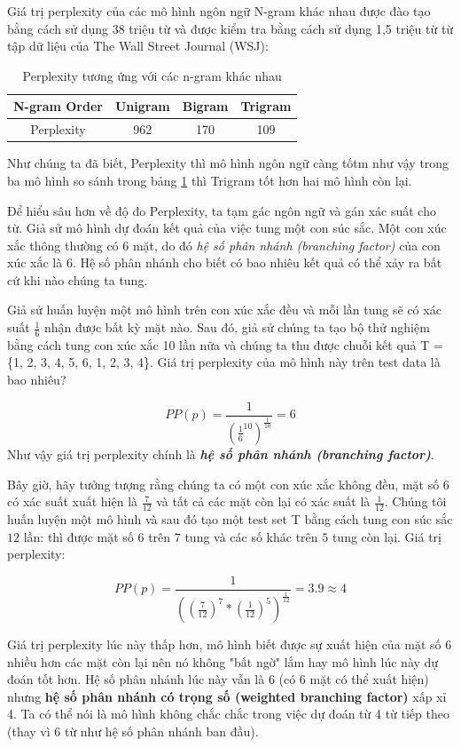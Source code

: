 Giá trị perplexity của các mô hình ngôn ngữ N-gram khác nhau được đào tạo bằng cách sử dụng 38 triệu từ và được kiểm tra bằng cách sử dụng 1,5 triệu từ từ tập dữ liệu của The Wall Street Journal (WSJ):
\begin{table}[H]
\centering
\begin{tabular}{ |c|c|c|c| }
 \hline
 N-gram Order & Unigram & Bigram & Trigram \\
  \hline
 Perplexity & 962 & 170 & 109 \\
 \hline
\end{tabular}
\caption{Perplexity tương ứng với các n-gram khác nhau}
\label{Perplexity}
\end{table}
 Như chúng ta đã biết, Perplexity thì mô hình ngôn ngữ càng tốtm như vậy trong ba mô hình so sánh trong bảng \ref{Perplexity} thì Trigram tốt hơn hai mô hình còn lại.

 Để hiểu sâu hơn về độ đo Perplexity, ta tạm gác ngôn ngữ và gán xác suất cho từ. Giả sử mô hình dự đoán kết quả của việc tung một con súc sắc. Một con xúc xắc thông thường có 6 mặt, do đó \textit{hệ số phân nhánh (branching factor)} của con xúc xắc là 6. Hệ số phân nhánh cho biết có bao nhiêu kết quả có thể xảy ra bất cứ khi nào chúng ta tung.

 Giả sử huấn luyện một mô hình trên con xúc xắc đều và mỗi lần tung sẽ có xác suất $\frac{1}{6}$ nhận được bất kỳ mặt nào. Sau đó, giả sử chúng ta tạo bộ thử nghiệm bằng cách tung con xúc xắc 10 lần nữa và chúng ta thu được chuỗi kết quả  T = \{1, 2, 3, 4, 5, 6, 1, 2, 3, 4\}. Giá trị perplexity của mô hình này trên test data là bao nhiêu?

 $$PP(p)=\frac{1}{(\frac{1}{6}^{10})^{\frac{1}{10}}}=6$$
 Như vậy giá trị perplexity chính là \textbf{\textit{hệ số phân nhánh (branching factor)}}.

 Bây giờ, hãy tưởng tượng rằng chúng ta có một con xúc xắc không đều, mặt số 6 có xác suất xuất hiện là $\frac{7}{12}$ và tất cả các mặt còn lại có xác suất là $\frac{1}{12}$. Chúng tôi huấn luyện một mô hình và sau đó tạo một test set T bằng cách tung con súc sắc $12$ lần: thì được mặt số $6$ trên $7$ tung và các số khác trên $5$ tung còn lại. Giá trị perplexity:

  $$PP(p)=\frac{1}{((\frac{7}{12})^{7}*(\frac{1}{12})^{5})^{\frac{1}{12}}}=3.9\approx 4$$

  Giá trị perplexity lúc này thấp hơn, mô hình biết được sự xuất hiện của mặt số 6 nhiều hơn các mặt còn lại nên nó không "bất ngờ" lắm hay mô hình lúc này dự đoán tốt hơn. Hệ số phân nhánh lúc này vẫn là 6 (có 6 mặt có thể xuất hiện) nhưng \textbf{hệ số phân nhánh có trọng số (weighted branching factor)} xấp xỉ 4. Ta có thể nói là mô hình không chắc chắc trong việc dự đoán từ 4 từ tiếp theo (thay vì 6
 từ như hệ số phân nhánh ban đầu).

